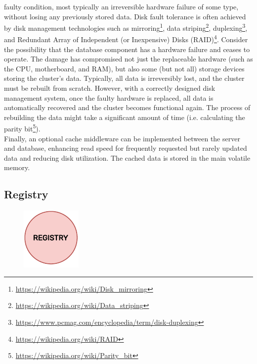 faulty condition, most typically an irreversible hardware failure of some type,
without losing any previously stored data. Disk fault tolerance is often achieved
by disk management technologies such as mirroring\footnote{\url{https://wikipedia.org/wiki/Disk_mirroring}},
data striping\footnote{\url{https://wikipedia.org/wiki/Data_striping}}, duplexing\footnote{\url{https://www.pcmag.com/encyclopedia/term/disk-duplexing}},
and Redundant Array of Independent (or Inexpensive) Disks (RAID)\footnote{\url{https://wikipedia.org/wiki/RAID}}\cite{disk_management_technologies}.
Consider the possibility that the database component has a hardware failure and
ceases to operate. The damage has compromised not just the replaceable hardware (such
as the CPU, motherboard, and RAM), but also some (but not all) storage devices
storing the cluster's data. Typically, all data is irreversibly lost, and the cluster
must be rebuilt from scratch. However, with a correctly designed disk management
system, once the faulty hardware is replaced, all data is automatically recovered
and the cluster becomes functional again. The process of rebuilding the data
might take a significant amount of time (i.e. calculating the parity bit\footnote{\url{https://wikipedia.org/wiki/Parity_bit}}).
\\ %
Finally, an optional cache middleware can be implemented between the server and
database, enhancing read speed for frequently requested but rarely updated data and
reducing disk utilization. The cached data is stored in the main volatile memory.

\subsection{Registry}
\label{subsec:architecture_components_registry}

\begin{figure}
  \centering
  \includegraphics[width=\linewidth]{images/architecture/registry.pdf}
\end{figure}

